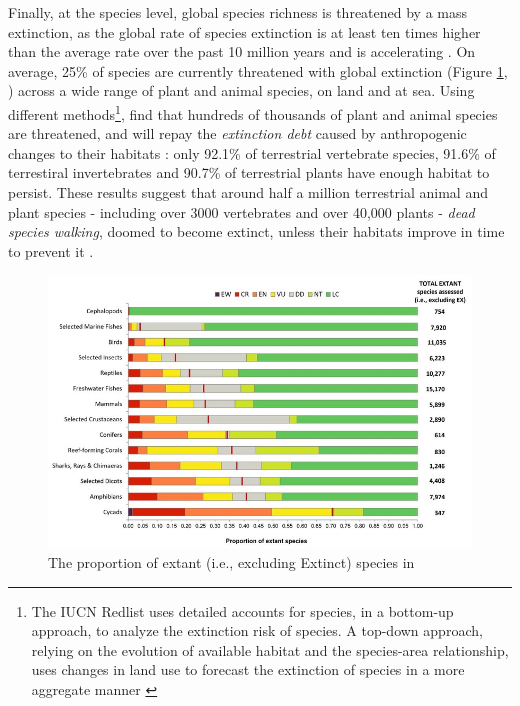 Finally, at the species level, global species richness is threatened by a mass extinction, as the global rate of species extinction is at least ten times higher than the average rate over the past 10 million years and is accelerating \citep{barnosky_has_2011, ceballos_accelerated_2015}. On average, 25\% of species are currently threatened with global extinction (Figure \ref{fig:intro_iucn}, \cite{IUCN_redlist_2024}) across a wide range of plant and animal species, on land and at sea. Using different methods\footnote{ The IUCN Redlist uses detailed accounts for species, in a bottom-up approach, to analyze the extinction risk of species. A top-down approach, relying on the evolution of available habitat and the species-area relationship, uses changes in land use to forecast the extinction of species in a more aggregate manner \citep{Diamond1972BiogeographicKE}}, \cite{Hoskins309377} find that hundreds of thousands of plant and animal species are threatened, and will repay the \textit{extinction debt} caused by anthropogenic changes to their habitats : only 92.1\% of terrestrial vertebrate species, 91.6\% of terrestiral invertebrates and 90.7\% of terrestrial plants have enough habitat to persist. These results suggest that around half a million terrestrial animal and plant species - including over 3000 vertebrates and over 40,000 plants - \textit{dead species walking}, doomed to become extinct, unless their habitats improve in time to prevent it \citep{ipbes_2022_6417333}.

\begin{figure}[h]
    \centering
    \includegraphics[width=0.8\linewidth]{figures/intro/IUCN_redlist}
    \caption{The proportion of extant (i.e., excluding Extinct) species in \citet{IUCN_redlist_2024}}
    \label{fig:intro_iucn}
\end{figure}
  
